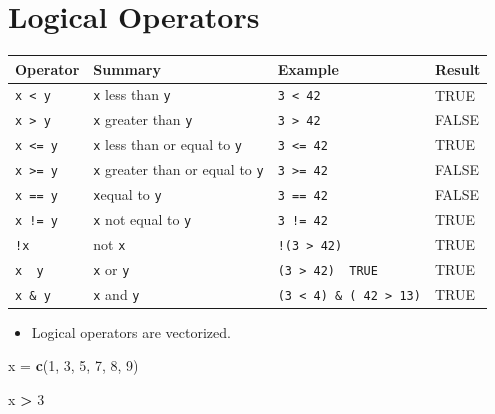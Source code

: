 \documentclass[]{book}
\newenvironment{Shaded}{\begin{snugshade}}{\end{snugshade}}
\newcommand{\KeywordTok}[1]{\textcolor[rgb]{0.13,0.29,0.53}{\textbf{#1}}}
\newcommand{\DecValTok}[1]{\textcolor[rgb]{0.00,0.00,0.81}{#1}}
\newcommand{\StringTok}[1]{\textcolor[rgb]{0.31,0.60,0.02}{#1}}
\newcommand{\OperatorTok}[1]{\textcolor[rgb]{0.81,0.36,0.00}{\textbf{#1}}}
\newcommand{\NormalTok}[1]{#1}
\providecommand{\tightlist}{%
  \setlength{\itemsep}{0pt}\setlength{\parskip}{0pt}}
\begin{document}
\section{Logical Operators}\label{logical-operators}

\begin{longtable}[]{@{}llll@{}}
\toprule
Operator & Summary & Example & Result\tabularnewline
\midrule
\endhead
\texttt{x\ \textless{}\ y} & \texttt{x} less than \texttt{y} &
\texttt{3\ \textless{}\ 42} & TRUE\tabularnewline
\texttt{x\ \textgreater{}\ y} & \texttt{x} greater than \texttt{y} &
\texttt{3\ \textgreater{}\ 42} & FALSE\tabularnewline
\texttt{x\ \textless{}=\ y} & \texttt{x} less than or equal to
\texttt{y} & \texttt{3\ \textless{}=\ 42} & TRUE\tabularnewline
\texttt{x\ \textgreater{}=\ y} & \texttt{x} greater than or equal to
\texttt{y} & \texttt{3\ \textgreater{}=\ 42} & FALSE\tabularnewline
\texttt{x\ ==\ y} & \texttt{x}equal to \texttt{y} & \texttt{3\ ==\ 42} &
FALSE\tabularnewline
\texttt{x\ !=\ y} & \texttt{x} not equal to \texttt{y} &
\texttt{3\ !=\ 42} & TRUE\tabularnewline
\texttt{!x} & not \texttt{x} & \texttt{!(3\ \textgreater{}\ 42)} &
TRUE\tabularnewline
\texttt{x\ \textbar{}\ y} & \texttt{x} or \texttt{y} &
\texttt{(3\ \textgreater{}\ 42)\ \textbar{}\ TRUE} & TRUE\tabularnewline
\texttt{x\ \&\ y} & \texttt{x} and \texttt{y} &
\texttt{(3\ \textless{}\ 4)\ \&\ (\ 42\ \textgreater{}\ 13)} &
TRUE\tabularnewline
\bottomrule
\end{longtable}

\begin{itemize}
\tightlist
\item
  Logical operators are vectorized.
\end{itemize}

\begin{Shaded}
\begin{Highlighting}[]
\NormalTok{x =}\StringTok{ }\KeywordTok{c}\NormalTok{(}\DecValTok{1}\NormalTok{, }\DecValTok{3}\NormalTok{, }\DecValTok{5}\NormalTok{, }\DecValTok{7}\NormalTok{, }\DecValTok{8}\NormalTok{, }\DecValTok{9}\NormalTok{)}
\end{Highlighting}
\end{Shaded}

\begin{Shaded}
\begin{Highlighting}[]
\NormalTok{x }\OperatorTok{>}\StringTok{ }\DecValTok{3}
\end{Highlighting}
\end{Shaded}
\end{document}
